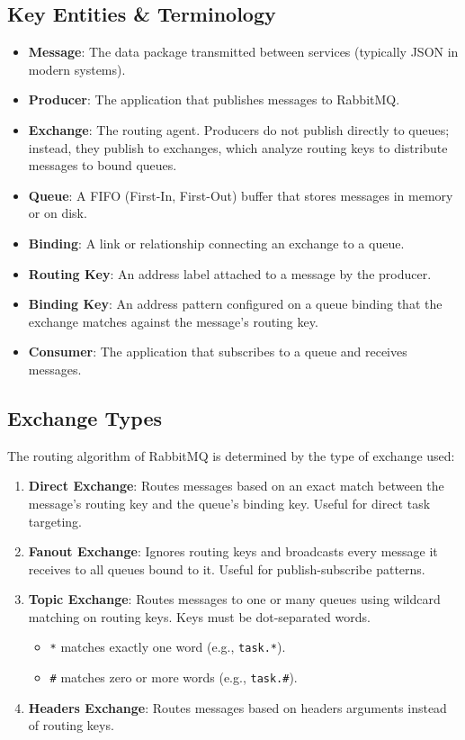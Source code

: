 \documentclass[11pt,a4paper]{article}
\begin{document}
\subsection{Key Entities \& Terminology}
\begin{itemize}
    \item \textbf{Message}: The data package transmitted between services (typically JSON in modern systems).
    \item \textbf{Producer}: The application that publishes messages to RabbitMQ.
    \item \textbf{Exchange}: The routing agent. Producers do not publish directly to queues; instead, they publish to exchanges, which analyze routing keys to distribute messages to bound queues.
    \item \textbf{Queue}: A FIFO (First-In, First-Out) buffer that stores messages in memory or on disk.
    \item \textbf{Binding}: A link or relationship connecting an exchange to a queue.
    \item \textbf{Routing Key}: An address label attached to a message by the producer.
    \item \textbf{Binding Key}: An address pattern configured on a queue binding that the exchange matches against the message's routing key.
    \item \textbf{Consumer}: The application that subscribes to a queue and receives messages.
\end{itemize}

\subsection{Exchange Types}
The routing algorithm of RabbitMQ is determined by the type of exchange used:
\begin{enumerate}
    \item \textbf{Direct Exchange}: Routes messages based on an exact match between the message's routing key and the queue's binding key. Useful for direct task targeting.
    \item \textbf{Fanout Exchange}: Ignores routing keys and broadcasts every message it receives to all queues bound to it. Useful for publish-subscribe patterns.
    \item \textbf{Topic Exchange}: Routes messages to one or many queues using wildcard matching on routing keys. Keys must be dot-separated words.
    \begin{itemize}
        \item \texttt{*} matches exactly one word (e.g., \texttt{task.*}).
        \item \texttt{\#} matches zero or more words (e.g., \texttt{task.\#}).
    \end{itemize}
    \item \textbf{Headers Exchange}: Routes messages based on headers arguments instead of routing keys.
\end{enumerate}
\end{document}
